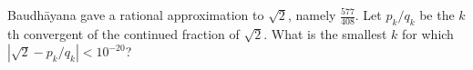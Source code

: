 
Baudhāyana gave a rational approximation to \(\sqrt{2}\), namely \(\displaystyle\frac{577}{408}\). Let \(p_k/q_k\) be the \(k\)th convergent of the continued fraction of \(\sqrt{2}\). What is the smallest \(k\) for which \(| \sqrt{2} - p_k/q_k | < 10^{-20}\)?
